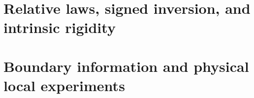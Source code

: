 \makeatletter
\def\@setabstracta{%
  \ifvoid\abstractbox\else
    \skip@20\p@ \advance\skip@-\lastskip
    \advance\skip@-\baselineskip \vskip\skip@
    \unvbox\abstractbox \prevdepth\z@
  \fi}
\makeatother
\maketitle
\setcounter{tocdepth}{1}
\tableofcontents



\part{Relative laws, signed inversion, and intrinsic rigidity}































\part{Boundary information and physical local experiments}

